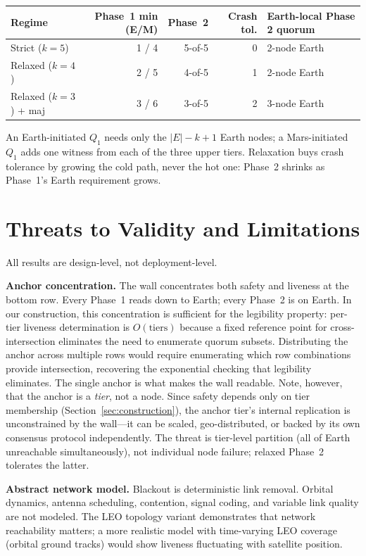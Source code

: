 \documentclass[11pt]{article}
\begin{document}
\begin{center}
\small
\begin{tabular}{lrrrl}
\toprule
Regime & Phase~1 min (E/M) & Phase~2 & Crash tol. & Earth-local Phase 2 quorum \\
\midrule
Strict ($k = 5$) & 1 / 4 & 5-of-5 & 0 & 2-node Earth \\
Relaxed ($k = 4$) & 2 / 5 & 4-of-5 & 1 & 2-node Earth \\
Relaxed ($k = 3$) + maj & 3 / 6 & 3-of-5 & 2 & 3-node Earth \\
\bottomrule
\end{tabular}
\end{center}
An Earth-initiated $Q_1$ needs only the $|E| - k + 1$ Earth nodes; a Mars-initiated $Q_1$ adds one witness from each of the three upper tiers. Relaxation buys crash tolerance by growing the cold path, never the hot one: Phase~2 shrinks as Phase~1's Earth requirement grows.


\section{Threats to Validity and Limitations}

All results are design-level, not deployment-level.

\textbf{Anchor concentration.} The wall concentrates both safety and liveness at the bottom row. Every Phase~1 reads down to Earth; every Phase~2 is on Earth. In our construction, this concentration is sufficient for the legibility property: per-tier liveness determination is $O(\text{tiers})$ because a fixed reference point for cross-intersection eliminates the need to enumerate quorum subsets. Distributing the anchor across multiple rows would require enumerating which row combinations provide intersection, recovering the exponential checking that legibility eliminates. The single anchor is what makes the wall readable. Note, however, that the anchor is a \emph{tier}, not a node. Since safety depends only on tier membership (Section~\ref{sec:construction}), the anchor tier's internal replication is unconstrained by the wall---it can be scaled, geo-distributed, or backed by its own consensus protocol independently. The threat is tier-level partition (all of Earth unreachable simultaneously), not individual node failure; relaxed Phase~2 tolerates the latter.

\textbf{Abstract network model.} Blackout is deterministic link removal. Orbital dynamics, antenna scheduling, contention, signal coding, and variable link quality are not modeled. The LEO topology variant demonstrates that network reachability matters; a more realistic model with time-varying LEO coverage (orbital ground tracks) would show liveness fluctuating with satellite position.
\end{document}
